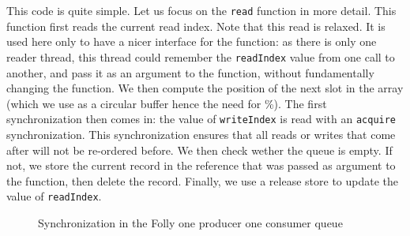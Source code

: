 This code is quite simple. Let us focus on the \texttt{read} function in more detail. This function first reads the current read index. Note that this read is relaxed. It is used here only to have a nicer interface for the function: as there is only one reader thread, this thread could remember the \texttt{readIndex} value from one call to another, and pass it as an argument to the function, without fundamentally changing the function. We then compute the position of the next slot in the array (which we use as a circular buffer hence the need for \%). The first synchronization then comes in: the value of \texttt{writeIndex} is read with an \texttt{acquire} synchronization. This synchronization ensures that all reads or writes that come after will not be re-ordered before. We then check wether the queue is empty. If not, we store the current record in the reference that was passed as argument to the function, then delete the record. Finally, we use a release store to update the value of \texttt{readIndex}.

\begin{figure}
		\begin{center}
\end{center}
\caption{Synchronization in the Folly one producer one consumer queue}

\label{fig:synchQueue}
\end{figure}


